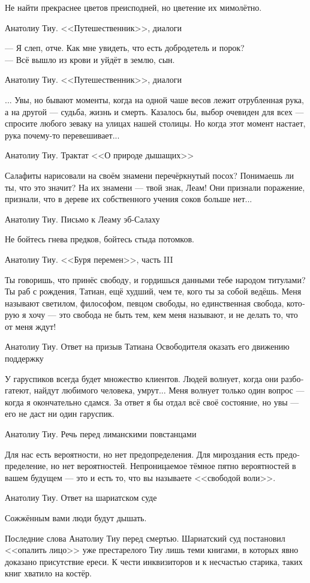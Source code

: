 \documentclass[a4paper,12pt,fleqn]{book}\usepackage{cooltooltips}\usepackage{polyglossia}\setdefaultlanguage[babelshorthands=true]{russian}\setotherlanguage{english}\defaultfontfeatures{Ligatures=TeX,Mapping=tex-text} \usepackage{xcolor}\definecolor{lightgray}{HTML}{bbbbbb}\color{lightgray}\newcommand{\ml}[3]{\textenglish{\textcolor{black}{#3}}}
\begin{document}
{\epigraph
{Не найти прекраснее цветов преисподней, но цветение их мимолётно.}
{Анатолиу Тиу.
<<Путешественник>>, диалоги}

\epigraph
{--- Я слеп, отче.
Как мне увидеть, что есть добродетель и порок?\\
--- Всё вышло из крови и уйдёт в землю, сын.}
{Анатолиу Тиу.
<<Путешественник>>, диалоги}

\epigraph
{... Увы, но бывают моменты, когда на одной чаше весов лежит отрубленная рука, а на другой --- судьба, жизнь и смерть.
Казалось бы, выбор очевиден для всех --- спросите любого зеваку на улицах нашей столицы.
Но когда этот момент настает, рука почему-то перевешивает...}
{Анатолиу Тиу.
Трактат <<О природе дышащих>>}

\epigraph
{Салафиты нарисовали на своём знамени перечёркнутый посох?
Понимаешь ли ты, что это значит?
На их знамени --- твой знак, Леам!
Они признали поражение, признали, что в дереве их собственного учения соков больше нет...}
{Анатолиу Тиу.
Письмо к Леаму эб-Салаху}

\epigraph
{Не бойтесь гнева предков, бойтесь стыда потомков.}
{Анатолиу Тиу.
<<Буря перемен>>, часть III}

\epigraph
{Ты говоришь, что принёс свободу, и гордишься данными тебе народом титулами?
Ты раб с рождения, Татиан, ещё худший, чем те, кого ты за собой ведёшь.
Меня называют светилом, философом, певцом свободы, но единственная свобода, которую я хочу --- это свобода не быть тем, кем меня называют, и не делать то, что от меня ждут!}
{Анатолиу Тиу.
Ответ на призыв Татиана Освободителя оказать его движению поддержку}

\epigraph
{У гаруспиков всегда будет множество клиентов.
Людей волнует, когда они разбогатеют, найдут любимого человека, умрут...
Меня волнует только один вопрос --- когда я окончательно сдамся.
За ответ я бы отдал всё своё состояние, но увы --- его не даст ни один гаруспик.}
{Анатолиу Тиу.
Речь перед лиманскими повстанцами}

\epigraph
{Для нас есть вероятности, но нет предопределения.
Для мироздания есть предопределение, но нет вероятностей.
Непроницаемое тёмное пятно вероятностей в вашем будущем --- это и есть то, что вы называете <<свободой воли>>.}
{Анатолиу Тиу.
Ответ на шариатском суде}

\epigraph
{Сожжённым вами люди будут дышать.}
{Последние слова Анатолиу Тиу перед смертью.
Шариатский суд постановил <<опалить лицо>> уже престарелого Тиу лишь теми книгами, в которых явно доказано присутствие ереси.
К чести инквизиторов и к несчастью старика, таких книг хватило на костёр.}

}
\end{document}
